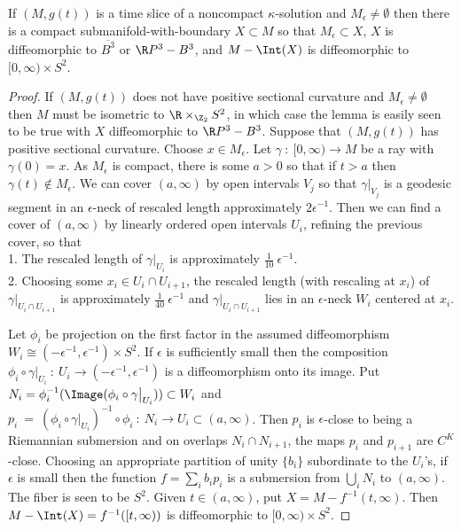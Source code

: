 \begin{lemma}
  \label{lem:kl-three-dimensional-solutions-existence-kappa-solutions}
 \label{noncompactsoliton}
If $(M, g(t))$ is a time slice of a
noncompact $\kappa$-solution and
$M_\epsilon \neq \emptyset$ then there is a compact
submanifold-with-boundary $X \subset M$ so that
$M_\epsilon \subset X$,  $X$ is diffeomorphic to $\overline{B^3}$ or
$\R P^3 - B^3$, and $M- \Int(X)$ is
diffeomorphic to $[0, \infty) \times S^2$.
\end{lemma}
\begin{proof}
If $(M,g(t))$ does not have positive sectional curvature and
$M_\epsilon \neq \emptyset$ then $M$ must be isometric to
$\R \times_{\Z_2} S^2$, in which case the lemma is easily seen to
be true with $X$ diffeomorphic to $\R P^3 - B^3$.
Suppose that $(M, g(t))$ has positive sectional curvature.
Choose $x \in M_\epsilon$. Let $\gamma \: : \: [0, \infty)
\rightarrow M$ be a ray with $\gamma(0) = x$. As $M_\epsilon$ is
compact, there is some $a > 0$ so that if $t > a$ then
$\gamma(t) \notin M_\epsilon$.
We can cover $(a, \infty)$ by open
intervals $V_j$ so that $\gamma \Big|_{V_j}$ is a geodesic segment
in an $\epsilon$-neck of
rescaled length approximately
$2 \epsilon^{-1}$.
Then we can find a cover of $(a, \infty)$ by
linearly ordered open intervals
$U_i$, refining the previous cover, so that \\
1. The rescaled length of $\gamma \Big|_{U_i}$ is approximately
$\frac{1}{10} \: \epsilon^{-1}$. \\
2. Choosing some $x_i \in U_i \cap U_{i+1}$, the
rescaled length (with rescaling at $x_i$) of
$\gamma \Big|_{U_i \cap U_{i+1}}$ is approximately
$\frac{1}{40} \: \epsilon^{-1}$ and
$\gamma \Big|_{U_i \cap U_{i+1}}$ lies in an $\epsilon$-neck $W_i$
centered at $x_i$.

Let $\phi_i$
be projection on the first factor in the assumed diffeomorphism
$W_i \cong  (- \epsilon^{-1}, \epsilon^{-1}) \times S^2$.
If $\epsilon$ is sufficiently small then
the composition $\phi_i \circ \gamma \big|_{U_i}  \: : \: U_i \rightarrow
(- \epsilon^{-1}, \epsilon^{-1})$ is a diffeomorphism onto its image.
Put $N_i = \phi_i^{-1}(\Image(\phi_i \circ \gamma \big|_{U_i})) \subset
W_i$ and
$p_i \: = \: (\phi_i \circ \gamma \big|_{U_i})^{-1} \circ \phi_i \: : \:
N_i \rightarrow U_i \subset (a, \infty)$. Then $p_i$ is $\epsilon$-close
to being a Riemannian submersion and
on overlaps $N_i \cap N_{i+1}$, the maps $p_i$ and $p_{i+1}$ are
$C^K$-close. Choosing an appropriate
partition of unity $\{b_i\}$ subordinate to the $U_i$'s, if $\epsilon$ is
small then the function
$f = \sum_i b_i p_i$ is a submersion from $\bigcup_i N_i$ to
$(a, \infty)$. The fiber is seen to be $S^2$. Given $t \in (a, \infty)$,
put $X = M - f^{-1}(t, \infty)$. Then $M - \Int(X) = f^{-1}([t, \infty))$
is diffeomorphic to $[0, \infty) \times S^2$.


\end{proof}

